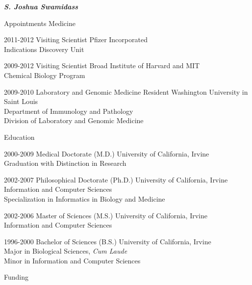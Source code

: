 \documentclass[10pt]{article}
\begin{document}
\begin{cv}{\huge \it \bfseries S. Joshua Swamidass}
\begin{cvlist}{Appointments}
Medicine
\item[2011-2012] Visiting Scientist \hfill Pfizer  Incorporated \\  \hspace*{\fill} Indications Discovery Unit
\item[2009-2012] Visiting Scientist \hfill Broad Institute of Harvard and MIT\\  \hspace*{\fill} Chemical Biology Program
\item[2009-2010] Laboratory and Genomic Medicine Resident \hfill Washington University in Saint Louis\\  \hspace*{\fill} Department of Immunology and Pathology \\ \hspace*{\fill} Division of Laboratory and Genomic Medicine

\end{cvlist}

\begin{cvlist}{Education}
\item[2000-2009] Medical Doctorate (M.D.)  \hfill University of California, Irvine \\ Graduation with Distinction in Research
\item[2002-2007] Philosophical Doctorate (Ph.D.) \hfill University of California, Irvine \\ Information and Computer Sciences \\ Specialization in Informatics in Biology and Medicine
\item[2002-2006] Master of Sciences (M.S.) \hfill University of California, Irvine \\ Information and Computer Sciences 
\item[1996-2000] Bachelor of Sciences (B.S.) \hfill University of California, Irvine \\ Major in Biological Sciences, \emph{Cum Laude}  \\Minor in Information and Computer Sciences
\end{cvlist}



\begin{cvlist}{Funding}




\end{cvlist}
\end{cv}
\end{document}
